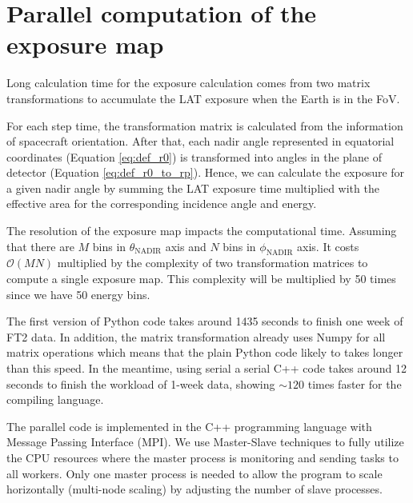 \chapter{Parallel computation of the exposure map}
\label{appendix:exposure}

Long calculation time for the exposure calculation comes from 
two matrix transformations to accumulate the LAT exposure 
when the Earth is in the FoV.

For each step time, 
the transformation matrix is calculated from the 
information of spacecraft orientation.
After that, each nadir angle 
represented in equatorial coordinates (Equation \ref{eq:def_r0})
is transformed into angles in the plane
of detector (Equation \ref{eq:def_r0_to_rp}).
Hence, we can calculate the exposure for a given nadir angle
by summing the LAT exposure time multiplied with 
the effective area for the corresponding incidence angle and energy.

The resolution of the exposure map impacts the computational time.
Assuming that there are $M$ bins in $\theta_\text{NADIR}$ axis
and $N$ bins in $\phi_\text{NADIR}$ axis.
It costs $\mathcal{O}(MN)$ multiplied
by the complexity of two 
transformation matrices to compute a single exposure map.
This complexity will be multiplied by 50 times 
since we have 50
energy bins.


The first version of Python code takes around 1435 seconds to finish 
one week of FT2 data.
In addition, the matrix transformation
already uses Numpy for
all matrix operations which means that the plain Python code 
likely to takes longer than this speed. In the meantime, using 
serial a serial C++ code takes around 12 seconds to finish 
the workload
of 1-week data, showing $\sim120$ times
faster for the compiling language.

The parallel code is implemented in the C++ programming language 
with Message Passing Interface (MPI). We use Master-Slave techniques
to fully utilize the CPU resources where the master process 
is monitoring and sending tasks to all workers.
Only one master process is needed to allow
the program to scale horizontally (multi-node scaling)
by adjusting the number of slave processes. 

